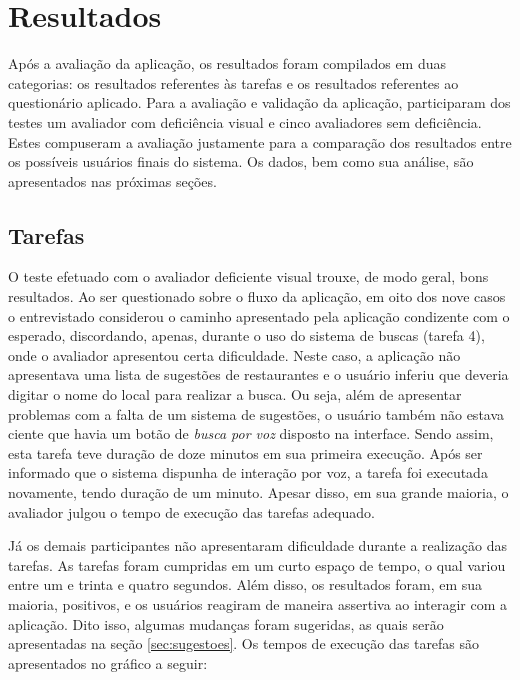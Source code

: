 \chapter{\label{chap:resultados}Resultados}

Após a avaliação da aplicação, os resultados foram compilados em duas categorias: os resultados referentes às tarefas e os resultados referentes ao questionário aplicado. Para a avaliação e validação da aplicação, participaram dos testes um avaliador com deficiência visual e cinco avaliadores sem deficiência. Estes compuseram a avaliação justamente para a comparação dos resultados entre os possíveis usuários finais do sistema. Os dados, bem como sua análise, são apresentados nas próximas seções.

\section{Tarefas}

O teste efetuado com o avaliador deficiente visual trouxe, de modo geral, bons resultados. Ao ser questionado sobre o fluxo da aplicação, em oito dos nove casos o entrevistado considerou o caminho apresentado pela aplicação condizente com o esperado, discordando, apenas, durante o uso do sistema de buscas (tarefa 4), onde o avaliador apresentou certa dificuldade. Neste caso, a aplicação não apresentava uma lista de sugestões de restaurantes e o usuário inferiu que deveria digitar o nome do local para realizar a busca. Ou seja, além de apresentar problemas com a falta de um sistema de sugestões, o usuário também não estava ciente que havia um botão de \emph{busca por voz} disposto na interface. Sendo assim, esta tarefa teve duração de doze minutos em sua primeira execução. Após ser informado que o sistema dispunha de interação por voz, a tarefa foi executada novamente, tendo duração de um minuto. Apesar disso, em sua grande maioria, o avaliador julgou o tempo de execução das tarefas adequado.

Já os demais participantes não apresentaram dificuldade durante a realização das tarefas. As tarefas foram cumpridas em um curto espaço de tempo, o qual variou entre um e trinta e quatro segundos. Além disso, os resultados foram, em sua maioria, positivos, e os usuários reagiram de maneira assertiva ao interagir com a aplicação. Dito isso, algumas mudanças foram sugeridas, as quais serão apresentadas na seção \ref{sec:sugestoes}. Os tempos de execução das tarefas são apresentados no gráfico a seguir:

